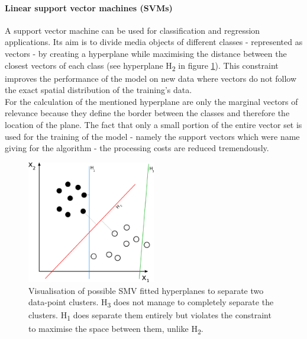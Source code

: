 \paragraph{Linear support vector machines (SVMs)}
A support vector machine can be used for classification and regression applications. Its aim is to divide media objects of different classes - represented as vectors - by creating a hyperplane while maximising the distance between the closest vectors of each class (see hyperplane H\textsubscript{2} in figure \ref{fig:SVM_visualisation}). This constraint improves the performance of the model on new data where vectors do not follow the exact spatial distribution of the training's data. \\
For the calculation of the mentioned hyperplane are only the marginal vectors of relevance because they define the border between the classes and therefore the location of the plane. The fact that only a small portion of the entire vector set is used for the training of the model - namely the support vectors which were name giving for the algorithm - the processing costs are reduced tremendously.

\begin{figure}[h]
   \centering
   \includegraphics[width=0.5\textwidth]{img/Svm_separating_hyperplanes}
   \caption{Visualisation of possible SMV fitted hyperplanes to separate two data-point clusters. H\textsubscript{3} does not manage to completely separate the clusters. H\textsubscript{1} does separate them entirely but violates the constraint to maximise the space between them, unlike H\textsubscript{2}.}
   \label{fig:SVM_visualisation}
\end{figure}

